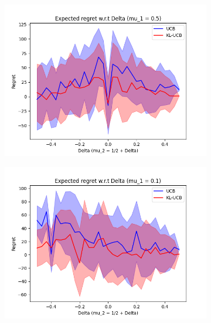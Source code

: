 \documentclass[a4paper]{article}
\begin{document}
\begin{figure}[h!]
    \centering
    \begin{subfigure}[b]{0.3\linewidth}
        \includegraphics[width=\linewidth]{images/05}
    \end{subfigure}
    \begin{subfigure}[b]{0.3\linewidth}
        \includegraphics[width=\linewidth]{images/01}
    \end{subfigure}
    \begin{subfigure}[b]{0.3\linewidth}

\end{subfigure}
\end{figure}
\end{document}
